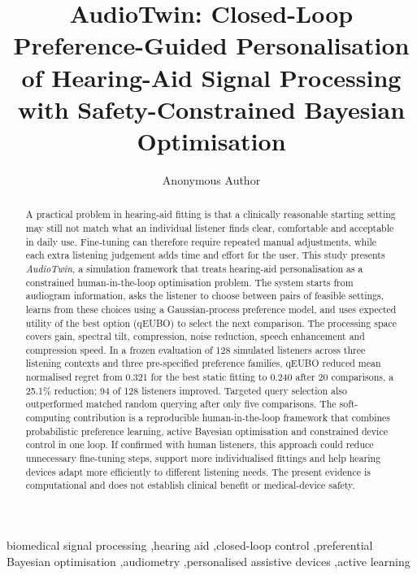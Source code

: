 \documentclass[preprint,12pt]{elsarticle}
\begin{document}
\begin{frontmatter}

\title{AudioTwin: Closed-Loop Preference-Guided Personalisation of Hearing-Aid Signal Processing with Safety-Constrained Bayesian Optimisation}

\author[anon]{Anonymous Author}
\address[anon]{Anonymous Institution}

\begin{abstract}
A practical problem in hearing-aid fitting is that a clinically reasonable starting setting may still not match what an individual listener finds clear, comfortable and acceptable in daily use. Fine-tuning can therefore require repeated manual adjustments, while each extra listening judgement adds time and effort for the user. This study presents \textit{AudioTwin}, a simulation framework that treats hearing-aid personalisation as a constrained human-in-the-loop optimisation problem. The system starts from audiogram information, asks the listener to choose between pairs of feasible settings, learns from these choices using a Gaussian-process preference model, and uses expected utility of the best option (qEUBO) to select the next comparison. The processing space covers gain, spectral tilt, compression, noise reduction, speech enhancement and compression speed. In a frozen evaluation of 128 simulated listeners across three listening contexts and three pre-specified preference families, qEUBO reduced mean normalised regret from 0.321 for the best static fitting to 0.240 after 20 comparisons, a 25.1\% reduction; 94 of 128 listeners improved. Targeted query selection also outperformed matched random querying after only five comparisons. The soft-computing contribution is a reproducible human-in-the-loop framework that combines probabilistic preference learning, active Bayesian optimisation and constrained device control in one loop. If confirmed with human listeners, this approach could reduce unnecessary fine-tuning steps, support more individualised fittings and help hearing devices adapt more efficiently to different listening needs. The present evidence is computational and does not establish clinical benefit or medical-device safety.
\end{abstract}

\begin{keyword}
biomedical signal processing \sep hearing aid \sep closed-loop control \sep preferential Bayesian optimisation \sep audiometry \sep personalised assistive devices \sep active learning
\end{keyword}

\end{frontmatter}
\end{document}

